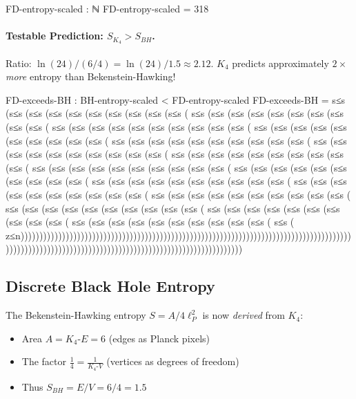 \documentclass[11pt,a4paper]{book}
\begin{document}
\begin{code}
  FD-entropy-scaled : ℕ
  FD-entropy-scaled = 318

\end{code}

\paragraph{Testable Prediction: $S_{K_4} > S_{BH}$.}
Ratio: $\ln(24) / (6/4) = \ln(24) / 1.5 \approx 2.12$.
$K_4$ predicts approximately $2\times$ \emph{more} entropy than Bekenstein-Hawking!

\begin{code}
  FD-exceeds-BH : BH-entropy-scaled < FD-entropy-scaled
  FD-exceeds-BH = s≤s (s≤s (s≤s (s≤s (s≤s (s≤s (s≤s (s≤s (s≤s (s≤s (
                  s≤s (s≤s (s≤s (s≤s (s≤s (s≤s (s≤s (s≤s (s≤s (s≤s (
                  s≤s (s≤s (s≤s (s≤s (s≤s (s≤s (s≤s (s≤s (s≤s (s≤s (
                  s≤s (s≤s (s≤s (s≤s (s≤s (s≤s (s≤s (s≤s (s≤s (s≤s (
                  s≤s (s≤s (s≤s (s≤s (s≤s (s≤s (s≤s (s≤s (s≤s (s≤s (
                  s≤s (s≤s (s≤s (s≤s (s≤s (s≤s (s≤s (s≤s (s≤s (s≤s (
                  s≤s (s≤s (s≤s (s≤s (s≤s (s≤s (s≤s (s≤s (s≤s (s≤s (
                  s≤s (s≤s (s≤s (s≤s (s≤s (s≤s (s≤s (s≤s (s≤s (s≤s (
                  s≤s (s≤s (s≤s (s≤s (s≤s (s≤s (s≤s (s≤s (s≤s (s≤s (
                  s≤s (s≤s (s≤s (s≤s (s≤s (s≤s (s≤s (s≤s (s≤s (s≤s (
                  s≤s (s≤s (s≤s (s≤s (s≤s (s≤s (s≤s (s≤s (s≤s (s≤s (
                  s≤s (s≤s (s≤s (s≤s (s≤s (s≤s (s≤s (s≤s (s≤s (s≤s (
                  s≤s (s≤s (s≤s (s≤s (s≤s (s≤s (s≤s (s≤s (s≤s (s≤s (
                  s≤s (s≤s (s≤s (s≤s (s≤s (s≤s (s≤s (s≤s (s≤s (s≤s (
                  s≤s (s≤s (s≤s (s≤s (s≤s (s≤s (s≤s (s≤s (s≤s (s≤s (
                  s≤s (
                  z≤n)))))))))))))))))))))))))))))))))))))))))))))))))))))))))))))))))))))))))))))))))))))))))))))))))))))))))))))))))))))))))))))))))))))))))))))))))))))))
\end{code}

\subsection{Discrete Black Hole Entropy}

The Bekenstein-Hawking entropy $S = A/4\ell_P^2$ is now \emph{derived} from $K_4$:
\begin{itemize}
  \item Area $A = K_4\text{-}E = 6$ (edges as Planck pixels)
  \item The factor $\frac{1}{4} = \frac{1}{K_4\text{-}V}$ (vertices as degrees of freedom)
  \item Thus $S_{BH} = E/V = 6/4 = 1.5$
\end{itemize}
\end{document}
